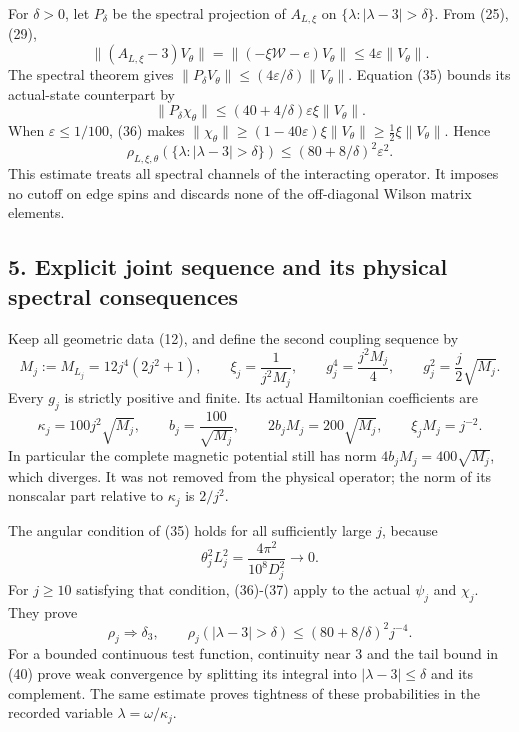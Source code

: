 \documentclass[
  11pt,
]{article}
\begin{document}
For \(\delta>0\), let \(P_\delta\) be the spectral projection of
\(A_{L,\xi}\) on \(\{\lambda:|\lambda-3|>\delta\}\). From (25),(29), \[
 \|(A_{L,\xi}-3)V_\theta\|
 =\|(-\xi\mathcal W-e)V_\theta\|
 \le4\varepsilon\|V_\theta\|.
\] The spectral theorem gives
\(\|P_\delta V_\theta\|\le(4\varepsilon/\delta)\|V_\theta\|\). Equation
(35) bounds its actual-state counterpart by \[
 \|P_\delta\chi_\theta\|
 \le(40+4/\delta)\varepsilon\xi\|V_\theta\|.
\] When \(\varepsilon\le1/100\), (36) makes
\(\|\chi_\theta\|\ge(1-40\varepsilon)\xi\|V_\theta\|\ge\tfrac12\xi\|V_\theta\|\).
Hence \[
 \boxed{\quad
 \rho_{L,\xi,\theta}(\{\lambda:|\lambda-3|>\delta\})
 \le(80+8/\delta)^2\varepsilon^2.
 \quad}
\tag{37}
\] This estimate treats all spectral channels of the interacting
operator. It imposes no cutoff on edge spins and discards none of the
off-diagonal Wilson matrix elements.

\subsection{5. Explicit joint sequence and its physical spectral
consequences}\label{explicit-joint-sequence-and-its-physical-spectral-consequences}

Keep all geometric data (12), and define the second coupling sequence by
\[
 M_j:=M_{L_j}=12j^4(2j^2+1),\qquad
 \xi_j=\frac1{j^2M_j},\qquad
 g_j^4=\frac{j^2M_j}{4},\qquad
 g_j^2=\frac j2\sqrt{M_j}.
\tag{38}
\] Every \(g_j\) is strictly positive and finite. Its actual Hamiltonian
coefficients are \[
 \kappa_j=100j^2\sqrt{M_j},\qquad
 b_j=\frac{100}{\sqrt{M_j}},\qquad
 2b_jM_j=200\sqrt{M_j},\qquad
 \xi_jM_j=j^{-2}.
\tag{39}
\] In particular the complete magnetic potential still has norm
\(4b_jM_j=400\sqrt{M_j}\), which diverges. It was not removed from the
physical operator; the norm of its nonscalar part relative to
\(\kappa_j\) is \(2/j^2\).

The angular condition of (35) holds for all sufficiently large \(j\),
because \[
 \theta_j^2L_j^2=\frac{4\pi^2}{10^8D_j^2}\longrightarrow0.
\] For \(j\ge10\) satisfying that condition, (36)-(37) apply to the
actual \(\psi_j\) and \(\chi_j\). They prove \[
 \rho_j\Longrightarrow\delta_3,\qquad
 \rho_j(|\lambda-3|>\delta)\le(80+8/\delta)^2j^{-4}.
\tag{40}
\] For a bounded continuous test function, continuity near 3 and the
tail bound in (40) prove weak convergence by splitting its integral into
\(|\lambda-3|\le\delta\) and its complement. The same estimate proves
tightness of these probabilities in the recorded variable
\(\lambda=\omega/\kappa_j\).
\end{document}
